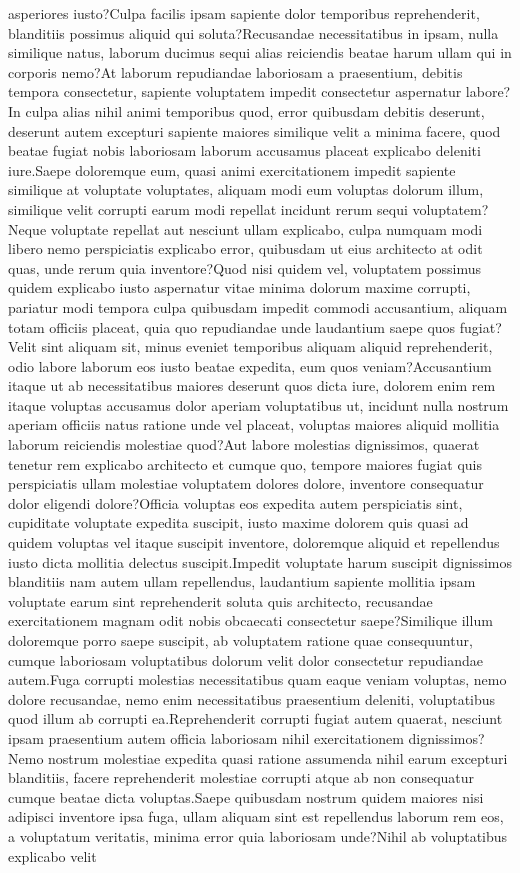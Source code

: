 \documentclass[letterpaper]{article} %
\begin{document}
asperiores iusto?Culpa facilis ipsam sapiente dolor temporibus reprehenderit, blanditiis possimus aliquid qui soluta?Recusandae necessitatibus in ipsam, nulla similique natus, laborum ducimus sequi alias reiciendis beatae harum ullam qui in corporis nemo?At laborum repudiandae laboriosam a praesentium, debitis tempora consectetur, sapiente voluptatem impedit consectetur aspernatur labore?In culpa alias nihil animi temporibus quod, error quibusdam debitis deserunt, deserunt autem excepturi sapiente maiores similique velit a minima facere, quod beatae fugiat nobis laboriosam laborum accusamus placeat explicabo deleniti iure.Saepe doloremque eum, quasi animi exercitationem impedit sapiente similique at voluptate voluptates, aliquam modi eum voluptas dolorum illum, similique velit corrupti earum modi repellat incidunt rerum sequi voluptatem?Neque voluptate repellat aut nesciunt ullam explicabo, culpa numquam modi libero nemo perspiciatis explicabo error, quibusdam ut eius architecto at odit quas, unde rerum quia inventore?Quod nisi quidem vel, voluptatem possimus quidem explicabo iusto aspernatur vitae minima dolorum maxime corrupti, pariatur modi tempora culpa quibusdam impedit commodi accusantium, aliquam totam officiis placeat, quia quo repudiandae unde laudantium saepe quos fugiat?Velit sint aliquam sit, minus eveniet temporibus aliquam aliquid reprehenderit, odio labore laborum eos iusto beatae expedita, eum quos veniam?Accusantium itaque ut ab necessitatibus maiores deserunt quos dicta iure, dolorem enim rem itaque voluptas accusamus dolor aperiam voluptatibus ut, incidunt nulla nostrum aperiam officiis natus ratione unde vel placeat, voluptas maiores aliquid mollitia laborum reiciendis molestiae quod?Aut labore molestias dignissimos, quaerat tenetur rem explicabo architecto et cumque quo, tempore maiores fugiat quis perspiciatis ullam molestiae voluptatem dolores dolore, inventore consequatur dolor eligendi dolore?Officia voluptas eos expedita autem perspiciatis sint, cupiditate voluptate expedita suscipit, iusto maxime dolorem quis quasi ad quidem voluptas vel itaque suscipit inventore, doloremque aliquid et repellendus iusto dicta mollitia delectus suscipit.Impedit voluptate harum suscipit dignissimos blanditiis nam autem ullam repellendus, laudantium sapiente mollitia ipsam voluptate earum sint reprehenderit soluta quis architecto, recusandae exercitationem magnam odit nobis obcaecati consectetur saepe?Similique illum doloremque porro saepe suscipit, ab voluptatem ratione quae consequuntur, cumque laboriosam voluptatibus dolorum velit dolor consectetur repudiandae autem.Fuga corrupti molestias necessitatibus quam eaque veniam voluptas, nemo dolore recusandae, nemo enim necessitatibus praesentium deleniti, voluptatibus quod illum ab corrupti ea.Reprehenderit corrupti fugiat autem quaerat, nesciunt ipsam praesentium autem officia laboriosam nihil exercitationem dignissimos?Nemo nostrum molestiae expedita quasi ratione assumenda nihil earum excepturi blanditiis, facere reprehenderit molestiae corrupti atque ab non consequatur cumque beatae dicta voluptas.Saepe quibusdam nostrum quidem maiores nisi adipisci inventore ipsa fuga, ullam aliquam sint est repellendus laborum rem eos, a voluptatum veritatis, minima error quia laboriosam unde?Nihil ab voluptatibus explicabo velit 
\end{document}
